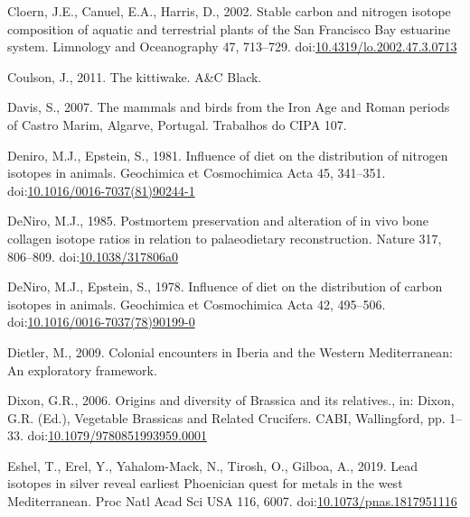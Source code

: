 \documentclass[review]{elsarticle} %
\newlength{\cslhangindent}
\newenvironment{CSLReferences}[2] %
 {%
  \setlength{\parindent}{0pt}
  \ifodd #1 \everypar{\setlength{\hangindent}{\cslhangindent}}\ignorespaces\fi
  \ifnum #2 > 0
  \setlength{\parskip}{#2\baselineskip}
  \fi
 }%
 {}
\begin{document}
\begin{CSLReferences}{1}{0}
\leavevmode{}%
Cloern, J.E., Canuel, E.A., Harris, D., 2002. Stable carbon and nitrogen isotope composition of aquatic and terrestrial plants of the {San Francisco Bay} estuarine system. Limnology and Oceanography 47, 713--729. doi:\href{https://doi.org/10.4319/lo.2002.47.3.0713}{10.4319/lo.2002.47.3.0713}

\leavevmode{}%
Coulson, J., 2011. The kittiwake. {A\&C Black}.

\leavevmode{}%
Davis, S., 2007. The mammals and birds from the {Iron Age} and {Roman} periods of {Castro Marim}, {Algarve}, {Portugal}. Trabalhos do CIPA 107.

\leavevmode{}%
Deniro, M.J., Epstein, S., 1981. Influence of diet on the distribution of nitrogen isotopes in animals. Geochimica et Cosmochimica Acta 45, 341--351. doi:\href{https://doi.org/10.1016/0016-7037(81)90244-1}{10.1016/0016-7037(81)90244-1}

\leavevmode{}%
DeNiro, M.J., 1985. Postmortem preservation and alteration of in vivo bone collagen isotope ratios in relation to palaeodietary reconstruction. Nature 317, 806--809. doi:\href{https://doi.org/10.1038/317806a0}{10.1038/317806a0}

\leavevmode{}%
DeNiro, M.J., Epstein, S., 1978. Influence of diet on the distribution of carbon isotopes in animals. Geochimica et Cosmochimica Acta 42, 495--506. doi:\href{https://doi.org/10.1016/0016-7037(78)90199-0}{10.1016/0016-7037(78)90199-0}

\leavevmode{}%
Dietler, M., 2009. Colonial encounters in {Iberia} and the {Western Mediterranean}: {An} exploratory framework.

\leavevmode{}%
Dixon, G.R., 2006. Origins and diversity of {Brassica} and its relatives., in: Dixon, G.R. (Ed.), Vegetable Brassicas and Related Crucifers. {CABI}, {Wallingford}, pp. 1--33. doi:\href{https://doi.org/10.1079/9780851993959.0001}{10.1079/9780851993959.0001}

\leavevmode{}%
Eshel, T., Erel, Y., Yahalom-Mack, N., Tirosh, O., Gilboa, A., 2019. Lead isotopes in silver reveal earliest {Phoenician} quest for metals in the west {Mediterranean}. Proc Natl Acad Sci USA 116, 6007. doi:\href{https://doi.org/10.1073/pnas.1817951116}{10.1073/pnas.1817951116}


\end{CSLReferences}
\end{document}
